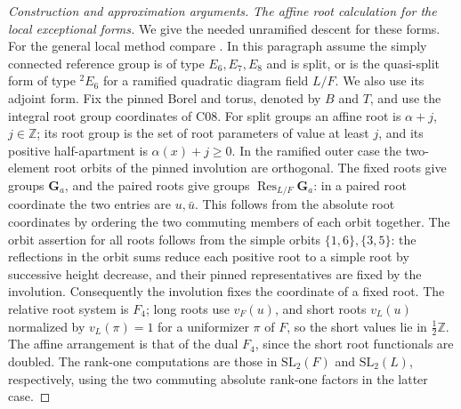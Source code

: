 \documentclass[11pt,a4paper,openany,oneside]{book}
\theoremstyle{resultstyle}
\theoremstyle{definition}
\numberwithin{equation}{chapter}
\begin{document}
\begin{proof}[Construction and approximation arguments]
\medskip\noindent
\textit{The affine root calculation for the local exceptional forms.}
We give the needed unramified descent for these forms. For the
general local method compare \cite{prasadunramified}.
In this paragraph assume the simply connected reference group is
of type \(E_6,E_7,E_8\) and is split, or is the quasi-split form of
type \({}^2E_6\) for a ramified quadratic diagram field \(L/F\).
We also use its adjoint form. Fix the pinned Borel and torus, denoted
by \(B\) and \(T\), and use the integral root group coordinates
of C08. For split groups an affine root is \(\alpha+j\),
\(j\in\mathbb Z\); its root group is the set of root parameters
of value at least \(j\), and its positive half-apartment is
\(\alpha(x)+j\geq 0\). In the ramified outer case the two-element
root orbits of the pinned involution are orthogonal. The fixed
roots give groups \(\mathbf G_a\), and the paired roots give
groups \(\operatorname{Res}_{L/F}\mathbf G_a\): in a paired root
coordinate the two entries are \(u,\bar u\). This follows from
the absolute root coordinates by ordering the two commuting
members of each orbit together. The orbit assertion for all
roots follows from the simple orbits \(\{1,6\},\{3,5\}\):
the reflections in the orbit sums reduce each positive root
to a simple root by successive height decrease, and their
pinned representatives are fixed by the involution. Consequently
the involution fixes the coordinate of a fixed root. The
relative root system is \(F_4\); long roots use \(v_F(u)\), and
short roots \(v_L(u)\) normalized by \(v_L(\pi)=1\) for a
uniformizer \(\pi\) of \(F\), so the short values lie in
\(\tfrac12\mathbb Z\). The affine arrangement is that of the dual
\(F_4\), since the short root functionals are doubled. The
rank-one computations are those in \(\mathrm{SL}_2(F)\) and
\(\mathrm{SL}_2(L)\), respectively, using the two commuting
absolute rank-one factors in the latter case.


\end{proof}
\end{document}

